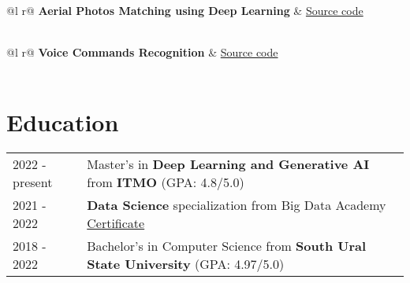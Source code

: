 \documentclass[a4paper,12pt]{article}
\begin{document}
\begin{tabularx}{\linewidth}{ @{}l r@{} }
\textbf{Aerial Photos Matching using Deep Learning} & \hfill \href{https://github.com/traptrip/ai-areal-photo}{Source code} \\[3.75pt]
  \\
\end{tabularx}

\begin{tabularx}{\linewidth}{ @{}l r@{} }
\textbf{Voice Commands Recognition} & \hfill \href{https://github.com/traptrip/Speech_commands_recognition}{Source code} \\[3.75pt]
  \\
\end{tabularx}


\section{Education}
\begin{tabularx}{\linewidth}{@{}l X@{}}	
2022 - present & Master's in \textbf{Deep Learning and Generative AI} from \textbf{ITMO} \hfill \normalsize (GPA: 4.8/5.0) \\
2021 - 2022 & \textbf{Data Science} specialization from Big Data Academy \hfill \normalsize \href{https://data.vk.company/curriculum/certificates/download/5013/d55bb369-58ba-46e3-b9e3-9202797b0bee/}{Certificate}\\
2018 - 2022 & Bachelor's in Computer Science from \textbf{South Ural State University} \hfill \normalsize  (GPA: 4.97/5.0) \\ 

\end{tabularx}


\end{document}

